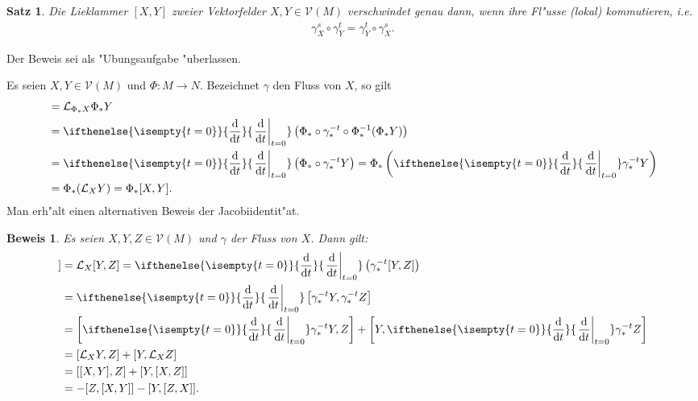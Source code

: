 \documentclass[paper=A4, twoside, chapterprefix=true, bibliography=totoc, headsepline]{scrbook}
\newcommand{\dop}{\mathrm{d}}
\newcommand{\difffrac}[3][]{\ifthenelse{\isempty{#1}}{\frac{\dop #2}{\dop #3}}{\left. \frac{\dop #2}{\dop #3} \right|_{#1}}}
\theoremstyle{plain}
\newtheorem{Satz}[Dfn]{Satz}
\theoremstyle{nonumberplain}
\newtheorem{bew}{Beweis}
\theoremstyle{empty}
\theoremstyle{break}
\begin{document}

\begin{Satz}
  Die Lieklammer $[X,Y]$ zweier Vektorfelder $X,Y \in \mathcal V(M)$ verschwindet genau dann, wenn ihre Fl"usse (lokal) kommutieren, i.e.
  \begin{align*}
    \gamma_X^s \circ \gamma_Y^t = \gamma_Y^t \circ \gamma_X^s.
  \end{align*}
\end{Satz}

Der Beweis sei als "Ubungsaufgabe "uberlassen.

Es seien $X,Y \in \mathcal V(M)$ und $\Phi \colon M \to N$.
Bezeichnet $\gamma$ den Fluss von $X$, so gilt
\begin{align*}
  [\Phi_{\ast}X,\Phi_{\ast}Y] & = \mathcal L_{\Phi_{\ast}X} \Phi_{\ast}Y\\
  & = \difffrac[t=0]{}{t}\left(\Phi_{\ast} \circ \gamma_{\ast}^{-t} \circ \Phi_{\ast}^{-1}(\Phi_{\ast}Y)\right)\\
  & = \difffrac[t=0]{}{t} \left(\Phi_{\ast} \circ \gamma_{\ast}^{-t}Y\right) 
  = \Phi_{\ast}\left(\difffrac[t=0]{}{t}\gamma_{\ast}^{-t}Y\right)\\
  & = \Phi_{\ast}(\mathcal L_XY) = \Phi_{\ast}[X,Y].
\end{align*}
Man erh"alt einen alternativen Beweis der Jacobiidentit"at.


\begin{bew}
  Es seien $X,Y, Z \in \mathcal V(M)$ und $\gamma$ der Fluss von $X$.
  Dann gilt:
  \begin{align*}
    [X,[Y,Z]] & = \mathcal L_X[Y,Z] 
    = \difffrac[t=0]{}{t}\left(\gamma_{\ast}^{-t}[Y,Z]\right)\\
    & = \difffrac[t=0]{}{t}\left[\gamma_{\ast}^{-t}Y,\gamma_{\ast}^{-t}Z\right]\\
    & = \left[\difffrac[t=0]{}{t} \gamma_{\ast}^{-t}Y,Z\right] + \left[Y, \difffrac[t=0]{}{t}\gamma_{\ast}^{-t}Z\right]\\
    & = [\mathcal L_XY,Z] + [Y,\mathcal L_XZ]\\
    & = [[X,Y],Z] + [Y,[X,Z]]\\
    & = -[Z,[X,Y]] - [Y,[Z,X]].
  \end{align*}
\end{bew}


\end{document}
